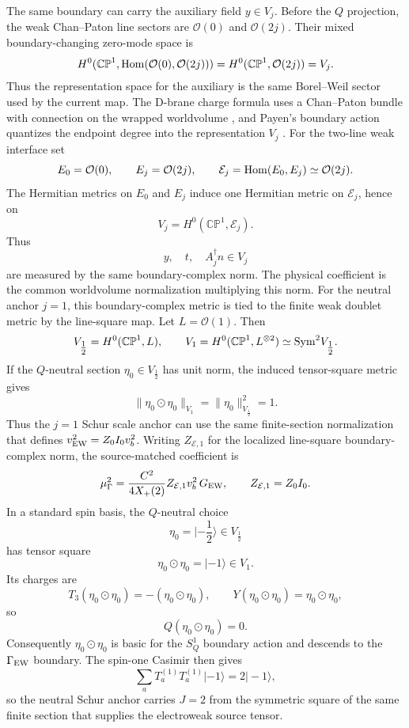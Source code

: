 \documentclass[11pt]{article}
\theoremstyle{definition}
\theoremstyle{remark}
\newcommand{\CP}{\mathbb{CP}}
\newcommand{\half}{\tfrac12}
\newcommand{\cO}{\mathcal O}
\begin{document}
The same boundary can carry the auxiliary field \(y\in V_j\).  Before the
\(Q\) projection, the weak Chan--Paton line sectors are \(\cO(0)\) and
\(\cO(2j)\).  Their mixed boundary-changing zero-mode space is
\[
  H^0(\CP^1,{\rm Hom}(\cO(0),\cO(2j)))
  =
  H^0(\CP^1,\cO(2j))
  =
  V_j.
\]
Thus the representation space for the auxiliary is the same Borel--Weil
sector used by the current map.
The D-brane charge formula uses a Chan--Paton bundle with connection on the
wrapped worldvolume \cite{MinasianMoore1997}, and Payen's boundary action
quantizes the endpoint degree into the representation \(V_j\)
\cite{Payen2007}.  For the two-line weak interface set
\[
  E_0=\cO(0),\qquad E_j=\cO(2j),\qquad
  \mathcal E_j={\rm Hom}(E_0,E_j)\simeq \cO(2j).
\]
The Hermitian metrics on \(E_0\) and \(E_j\) induce one Hermitian metric on
\(\mathcal E_j\), hence on
\[
  V_j=H^0(\CP^1,\mathcal E_j).
\]
Thus
\[
  y,\quad t,\quad A_j^\dagger n
  \in V_j
\]
are measured by the same boundary-complex norm.  The physical coefficient is
the common worldvolume normalization multiplying this norm.
For the neutral anchor \(j=1\), this boundary-complex metric is tied to the
finite weak doublet metric by the line-square map.  Let \(L=\cO(1)\).  Then
\[
  V_{\half}=H^0(\CP^1,L),
  \qquad
  V_1=H^0(\CP^1,L^{\otimes2})
  \simeq {\rm Sym}^2 V_{\half}.
\]
If the \(Q\)-neutral section \(\eta_0\in V_{\half}\) has unit norm, the
induced tensor-square metric gives
\[
  \|\eta_0\odot\eta_0\|_{V_1}
  =
  \|\eta_0\|_{V_{\half}}^2
  =
  1.
\]
Thus the \(j=1\) Schur scale anchor can use the same finite-section
normalization that defines \(v_{\rm EW}^2=Z_0I_0v_b^2\).
Writing \(Z_{\mathcal E,1}\) for the localized line-square boundary-complex
norm, the source-matched coefficient is
\[
  \mu_\Gamma^2
  =
  \frac{C^2}{4X_+(2)}
  Z_{\mathcal E,1}v_b^2\,G_{\rm EW},
  \qquad
  Z_{\mathcal E,1}=Z_0I_0.
\]
In a standard spin basis, the \(Q\)-neutral choice
\[
  \eta_0=|{\textstyle -\frac12}\rangle\in V_{\half}
\]
has tensor square
\[
  \eta_0\odot\eta_0=|-1\rangle\in V_1.
\]
Its charges are
\[
  T_3(\eta_0\odot\eta_0)=-(\eta_0\odot\eta_0),
  \qquad
  Y(\eta_0\odot\eta_0)=\eta_0\odot\eta_0,
\]
so
\[
  Q(\eta_0\odot\eta_0)=0.
\]
Consequently \(\eta_0\odot\eta_0\) is basic for the \(S^1_Q\) boundary action
and descends to the \(\Gamma_{\rm EW}\) boundary.
The spin-one Casimir then gives
\[
  \sum_aT_a^{(1)}T_a^{(1)}|-1\rangle=2|-1\rangle,
\]
so the neutral Schur anchor carries \(J=2\) from the symmetric square of the
same finite section that supplies the electroweak source tensor.
\end{document}

